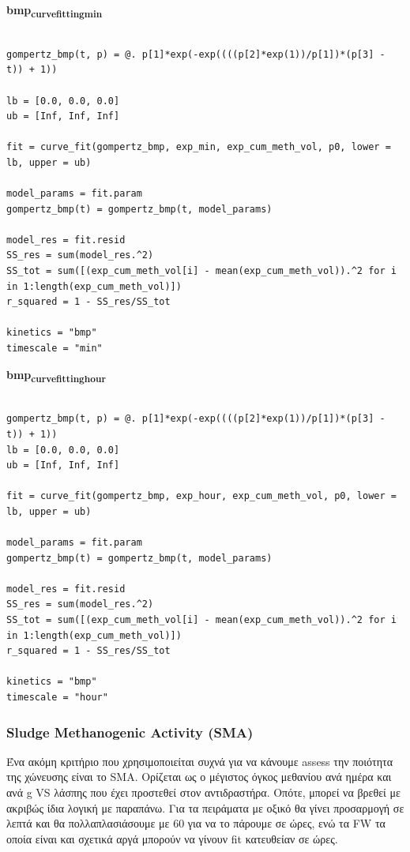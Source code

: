 \documentclass[11pt]{article}
\begin{document}
\textbf{bmp\textsubscript{curve}\textsubscript{fitting}\textsubscript{min}}
\begin{verbatim}

gompertz_bmp(t, p) = @. p[1]*exp(-exp((((p[2]*exp(1))/p[1])*(p[3] - t)) + 1))

lb = [0.0, 0.0, 0.0]
ub = [Inf, Inf, Inf]

fit = curve_fit(gompertz_bmp, exp_min, exp_cum_meth_vol, p0, lower = lb, upper = ub)

model_params = fit.param
gompertz_bmp(t) = gompertz_bmp(t, model_params)

model_res = fit.resid
SS_res = sum(model_res.^2)
SS_tot = sum([(exp_cum_meth_vol[i] - mean(exp_cum_meth_vol)).^2 for i in 1:length(exp_cum_meth_vol)])
r_squared = 1 - SS_res/SS_tot

kinetics = "bmp"
timescale = "min"
\end{verbatim}


\textbf{bmp\textsubscript{curve}\textsubscript{fitting}\textsubscript{hour}}
\begin{verbatim}

gompertz_bmp(t, p) = @. p[1]*exp(-exp((((p[2]*exp(1))/p[1])*(p[3] - t)) + 1))
lb = [0.0, 0.0, 0.0]
ub = [Inf, Inf, Inf]

fit = curve_fit(gompertz_bmp, exp_hour, exp_cum_meth_vol, p0, lower = lb, upper = ub)

model_params = fit.param
gompertz_bmp(t) = gompertz_bmp(t, model_params)

model_res = fit.resid
SS_res = sum(model_res.^2)
SS_tot = sum([(exp_cum_meth_vol[i] - mean(exp_cum_meth_vol)).^2 for i in 1:length(exp_cum_meth_vol)])
r_squared = 1 - SS_res/SS_tot

kinetics = "bmp"
timescale = "hour"
\end{verbatim}

\subsubsection{Sludge Methanogenic Activity (SMA)}
\label{sec:org86b43c5}
Ένα ακόμη κριτήριο που χρησιμοποιείται συχνά για να κάνουμε assess την ποιότητα της χώνευσης είναι το SMA. Ορίζεται ως ο μέγιστος όγκος μεθανίου ανά ημέρα και ανά g VS λάσπης που έχει προστεθεί στον αντιδραστήρα. Οπότε, μπορεί να βρεθεί με ακριβώς ίδια λογική με παραπάνω. Για τα πειράματα με οξικό θα γίνει προσαρμογή σε λεπτά και θα πολλαπλασιάσουμε με 60 για να το πάρουμε σε ώρες, ενώ τα FW τα οποία είναι και σχετικά αργά μπορούν να γίνουν fit κατευθείαν σε ώρες.
\end{document}
